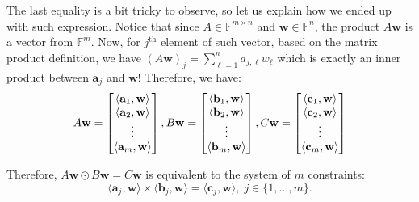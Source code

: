 \documentclass[../lecture-notes.tex]{subfiles}
\begin{document}
The last equality is a bit tricky to observe, so let us explain how we ended up with such expression. Notice that since $A \in \mathbb{F}^{m \times n}$ and $\mathbf{w} \in \mathbb{F}^n$, the product $A\mathbf{w}$ is a vector from $\mathbb{F}^m$. Now, for $j^{\text{th}}$ element of such vector, based on the matrix product definition, we have $(A\mathbf{w})_j = \sum_{\ell=1}^na_{j,\ell}w_{\ell}$ which is exactly an inner product between $\mathbf{a}_j$ and $\mathbf{w}$! Therefore, we have:
\begin{equation*}
    A\mathbf{w} = \begin{bmatrix}
        \langle \mathbf{a}_1, \mathbf{w}\rangle \\
        \langle \mathbf{a}_2, \mathbf{w}\rangle \\
        \vdots \\
        \langle \mathbf{a}_m, \mathbf{w}\rangle 
    \end{bmatrix}, \quad \\
    B\mathbf{w} = \begin{bmatrix}
        \langle \mathbf{b}_1, \mathbf{w}\rangle \\
        \langle \mathbf{b}_2, \mathbf{w}\rangle \\
        \vdots \\
        \langle \mathbf{b}_m, \mathbf{w}\rangle 
    \end{bmatrix}, \quad \\
    C\mathbf{w} = \begin{bmatrix}
        \langle \mathbf{c}_1, \mathbf{w}\rangle \\
        \langle \mathbf{c}_2, \mathbf{w}\rangle \\
        \vdots \\
        \langle \mathbf{c}_m, \mathbf{w}\rangle 
    \end{bmatrix}
\end{equation*}

Therefore, $A\mathbf{w} \odot B\mathbf{w} = C\mathbf{w}$ is equivalent to the system of $m$ constraints:
\begin{equation*}
    \langle \mathbf{a}_j, \mathbf{w}\rangle \times \langle \mathbf{b}_j, \mathbf{w} \rangle = \langle \mathbf{c}_j, \mathbf{w} \rangle, \; j \in \{1,\dots,m\}.
\end{equation*}
\end{document}

